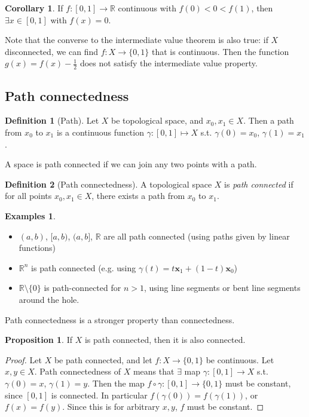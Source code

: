 \documentclass[a4paper,11pt]{article}
\theoremstyle{definition}
\newtheorem*{defn}{Definition}
\newtheorem*{prop}{Proposition}
\newtheorem*{exs}{Examples}
\newtheorem*{cor}{Corollary}
\numberwithin{equation}{section}
\begin{document}
\begin{cor}
If $f:[0,1]\rightarrow\mathbb{R}$ continuous with $f(0)<0<f(1)$, then $\exists x\in[0,1]$ with $f(x)=0$.
\end{cor}

Note that the converse to the intermediate value theorem is also true: if $X$ disconnected, we can find $f:X\rightarrow\{0,1\}$ that is continuous. Then the function $g(x)=f(x)-\frac{1}{2}$ does not satisfy the intermediate value property.

\subsection{Path connectedness}
\begin{defn}[Path]
    Let $X$ be topological space, and $x_0, x_1\in X$. Then a path from $x_0$ to $x_1$ is a continuous function $\gamma:[0,1]\mapsto X$ s.t. $\gamma(0)=x_0$, $\gamma(1)=x_1$.
\end{defn}

A space is path connected if we can join any two points with a path.

\begin{defn}[Path connectedness]
    A topological space $X$ is \emph{path connected} if for all points $x_0, x_1\in X$, there exists a path from $x_0$ to $x_1$.
\end{defn}

\begin{exs}
\leavevmode
\begin{itemize}
    \item $(a,b)$, $[a,b)$, $(a,b]$, $\mathbb{R}$ are all path connected (using paths given by linear functions)
    \item $\mathbb{R}^n$ is path connected (e.g. using $\gamma(t)=t\mathbf{x}_1+(1-t)\mathbf{x}_0$)
    \item $\mathbb{R}\setminus\{0\}$ is path-connected for $n>1$, using line segments or bent line segments around the hole. 
\end{itemize}
\end{exs}

Path connectedness is a stronger property than connectedness.

\begin{prop}
    If $X$ is path connected, then it is also connected.
\end{prop}

\begin{proof}
Let $X$ be path connected, and let $f:X\rightarrow\{0,1\}$ be continuous. Let $x,y\in X$. Path connectedness of $X$ means that $\exists$ map $\gamma:[0,1]\rightarrow X$ s.t. $\gamma(0)=x$, $\gamma(1)=y$. Then the map $f\circ\gamma:[0,1]\rightarrow\{0,1\}$ must be constant, since $[0,1]$ is connected. In particular $f(\gamma(0))=f(\gamma(1))$, or $f(x)=f(y)$. Since this is for arbitrary $x,y$, $f$ must be constant.
\end{proof}
\end{document}
